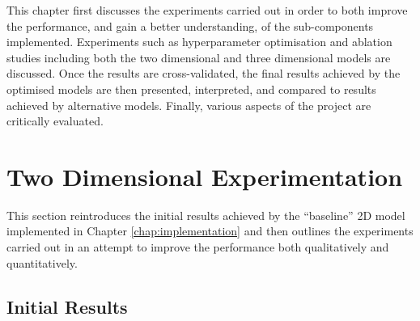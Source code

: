 This chapter first discusses the experiments carried out in order to both improve the performance, and gain a better understanding, of the sub-components implemented. Experiments such as hyperparameter optimisation and ablation studies including both the two dimensional and three dimensional models are discussed. Once the results are cross-validated, the final results achieved by the optimised models are then presented, interpreted, and compared to results achieved by alternative models. Finally, various aspects of the project are critically evaluated.

\section{Two Dimensional Experimentation}

This section reintroduces the initial results achieved by the ``baseline'' 2D model implemented in Chapter \ref{chap:implementation} and then outlines the experiments carried out in an attempt to improve the performance both qualitatively and quantitatively.

\subsection{Initial Results}

